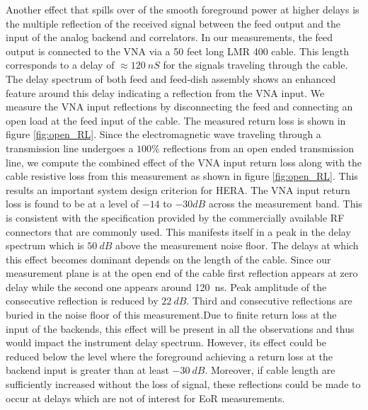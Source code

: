 \documentclass[twocolumn]{emulateapj}
\begin{document}
    Another effect that spills over of the smooth foreground power at higher delays
    is the multiple reflection of the received signal between the feed output and
    the input of the analog backend and correlators. In our measurements, the feed
    output is connected to the VNA via a 50 feet long LMR 400 cable. This length
    corresponds to a delay of $\approx 120~nS$ for the signals traveling through
    the cable. The delay spectrum of both feed and feed-dish assembly shows an
    enhanced feature around this delay indicating a reflection from the VNA input. We
    measure the VNA input reflections by disconnecting the feed and connecting an
    open load at the feed input of the cable. The measured return loss is shown in
    figure \ref{fig:open_RL}. Since the electromagnetic wave traveling through
    a transmission line undergoes a $100\%$ reflections from an open ended
    transmission line, we compute the combined effect of the VNA input return loss
    along with the cable resistive loss from this measurement as shown in figure
    \ref{fig:open_RL}. This results an important system design criterion for HERA.
    The VNA input return loss is found to be at a level of $-14$ to $-30dB$ across
    the measurement band. This is consistent with the specification provided by the
    commercially available RF connectors that are commonly used. This manifests
    itself in a peak in the delay spectrum which is $50~dB$ above the measurement
    noise floor. The delays at which this effect becomes dominant depends on the
    length of the cable. Since our measurement plane is at the open end of the cable
    first reflection appears at zero delay while the second one appears around 120~ns. 
    Peak amplitude of the consecutive reflection is reduced by $22~dB$. Third and 
    consecutive reflections are buried in the noise floor of this measurement.Due to 
    finite return loss at the input of the backends,
    this effect will be present in all the observations and thus would impact the
    instrument delay spectrum. However, its effect could be reduced below the level
    where the foreground  achieving a return loss at the backend input is greater
    than at least $-30~dB$. Moreover, if cable length are sufficiently increased
    without the loss of signal, these reflections could be made to occur at delays
    which are not of interest for EoR measurements.
    
\end{document}
